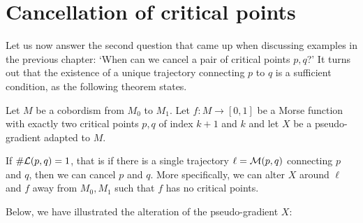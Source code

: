 \section{Cancellation of critical points}

Let us now answer the second question that came up when discussing examples in the previous chapter: `When can we cancel a pair of critical points $p, q$?'
It turns out that the existence of a unique trajectory connecting $p$ to  $q$ is a sufficient condition, as the following theorem states.


\begin{theorem}
    Let $M$ be a cobordism from $M_0$ to $M_1$.
    Let $f: M \to  [0,1]$ be a Morse function with exactly two critical points $p, q$ of index  $k+1$ and  $k$ and let $X$ be a pseudo-gradient adapted to $M$.

    If $\# \mathcal L(p, q) = 1$, that is if there is a single trajectory $\ell = \mathcal M(p, q)$ connecting $p$ and  $q$, then we can cancel $p$ and  $q$.
    More specifically, we can alter $X$ around  $\ell$ and $f$ away from  $M_0, M_1$ such that $f$ has no critical points.
    \label{firstcancellation}
\end{theorem}

Below, we have illustrated the alteration of the pseudo-gradient $X$:
\begin{figure}[H]
    \centering
\end{figure}

